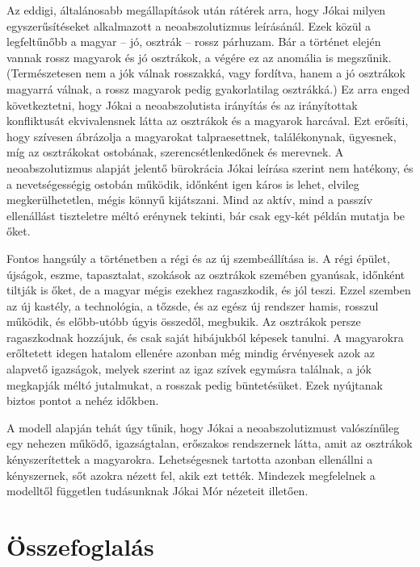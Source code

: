\documentclass{thesis-ekf}
\begin{document}
    Az eddigi, általánosabb megállapítások után rátérek arra, hogy Jókai milyen egyszerűsítéseket alkalmazott
        a neoabszolutizmus leírásánál.
    Ezek közül a legfeltűnőbb a magyar – jó, osztrák – rossz párhuzam.
    Bár a történet elején vannak rossz magyarok és jó osztrákok, a végére ez az anomália is megszűnik.
    (Természetesen nem a jók válnak rosszakká, vagy fordítva, hanem a jó osztrákok magyarrá válnak,
        a rossz magyarok pedig gyakorlatilag osztrákká.)
    Ez arra enged következtetni, hogy Jókai a neoabszolutista irányítás és az irányítottak konfliktusát
        ekvivalensnek látta az osztrákok és a magyarok harcával.
    Ezt erősíti, hogy szívesen ábrázolja a magyarokat talpraesettnek, találékonynak, ügyesnek,
        míg az osztrákokat ostobának, szerencsétlenkedőnek és merevnek.
    A neoabszolutizmus alapját jelentő bürokrácia Jókai leírása szerint nem hatékony, és a nevetségességig
        ostobán működik, időnként igen káros is lehet, elvileg megkerülhetetlen, mégis könnyű kijátszani.
    Mind az aktív, mind a passzív ellenállást tiszteletre méltó erénynek tekinti, bár csak egy-két példán mutatja be őket.

    Fontos hangsúly a történetben a régi és az új szembeállítása is.
    A régi épület, újságok, eszme, tapasztalat, szokások az osztrákok szemében gyanúsak, időnként tiltják is őket,
        de a magyar mégis ezekhez ragaszkodik, és jól teszi.
    Ezzel szemben az új kastély, a technológia, a tőzsde, és az egész új rendszer hamis, rosszul működik,
        és előbb-utóbb úgyis összedől, megbukik.
    Az osztrákok persze ragaszkodnak hozzájuk, és csak saját hibájukból képesek tanulni.
    A magyarokra erőltetett idegen hatalom ellenére azonban még mindig érvényesek azok az alapvető igazságok,
        melyek szerint az igaz szívek egymásra találnak, a jók megkapják méltó jutalmukat, a rosszak pedig büntetésüket.
    Ezek nyújtanak biztos pontot a nehéz időkben.

    A modell alapján tehát úgy tűnik, hogy Jókai a neoabszolutizmust valószínűleg egy nehezen működő, igazságtalan,
        erőszakos rendszernek látta, amit az osztrákok kényszerítettek a magyarokra.
    Lehetségesnek tartotta azonban ellenállni a kényszernek, sőt azokra nézett fel, akik ezt tették.
    Mindezek megfelelnek a modelltől független tudásunknak Jókai Mór nézeteit illetően.

    \chapter{Összefoglalás}
\end{document}
